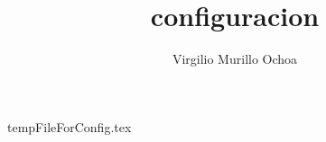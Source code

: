 \documentclass[15pt]{extarticle}
\title{configuracion}
\author{Virgilio Murillo Ochoa}
\begin{document}
{tempFileForConfig.tex}
\end{document}
